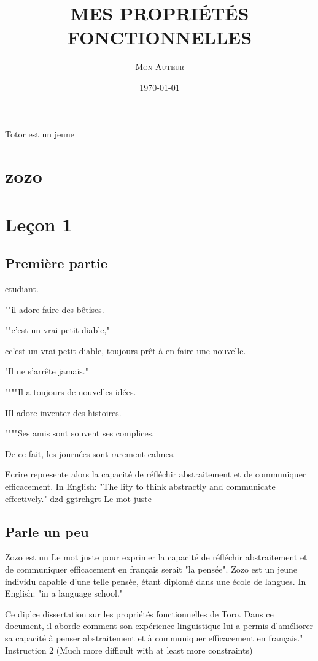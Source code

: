 \documentclass{article}
\title{\MakeUppercase{\textsc{Mes Propriétés Fonctionnelles}}}
\author{\textsc{Mon Auteur}}
\date{\today}
\begin{document}
\maketitle

Totor est un jeune

\section{zozo}

\section{Leçon 1} \subsection{Première partie}

etudiant.

""il adore faire des bêtises.

""c'est un vrai petit diable,"

cc'est un vrai petit diable, toujours prêt à en faire une nouvelle.

"Il ne s'arrête jamais."

""""Il a toujours de nouvelles idées.

IIl adore inventer des histoires.

""""Ses amis sont souvent ses complices.

De ce fait, les journées sont rarement calmes.



Ecrire represente alors la capacité de réfléchir abstraitement et de communiquer efficacement. In English: "The lity to think abstractly and communicate effectively." dzd ggtrehgrt
Le mot juste	

\subsection{Parle un peu}

Zozo est un Le mot juste pour exprimer la capacité de réfléchir abstraitement et de communiquer efficacement en français serait "la pensée". Zozo est un jeune individu capable d'une telle pensée, étant diplomé dans une école de langues. In English: "in a language school."

Ce diplce dissertation sur les propriétés fonctionnelles de Toro. Dans ce document, il aborde comment son expérience linguistique lui a permis d'améliorer sa capacité à penser abstraitement et à communiquer efficacement en français." Instruction 2 (Much more difficult with at least more constraints)
\end{document}

